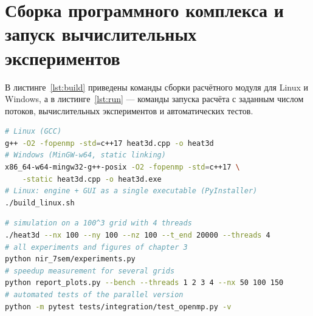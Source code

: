 \chapter{Сборка программного комплекса и запуск вычислительных экспериментов}
\label{app:build}

В листинге~\ref{lst:build} приведены команды сборки расчётного модуля для Linux и Windows, а в листинге~\ref{lst:run} --- команды запуска расчёта с заданным числом потоков, вычислительных экспериментов и автоматических тестов.

\begin{lstlisting}[language=bash, caption={Сборка расчётного модуля}, label=lst:build]
# Linux (GCC)
g++ -O2 -fopenmp -std=c++17 heat3d.cpp -o heat3d
# Windows (MinGW-w64, static linking)
x86_64-w64-mingw32-g++-posix -O2 -fopenmp -std=c++17 \
    -static heat3d.cpp -o heat3d.exe
# Linux: engine + GUI as a single executable (PyInstaller)
./build_linux.sh
\end{lstlisting}

\begin{lstlisting}[language=bash, caption={Запуск расчёта, экспериментов и тестов}, label=lst:run]
# simulation on a 100^3 grid with 4 threads
./heat3d --nx 100 --ny 100 --nz 100 --t_end 20000 --threads 4
# all experiments and figures of chapter 3
python nir_7sem/experiments.py
# speedup measurement for several grids
python report_plots.py --bench --threads 1 2 3 4 --nx 50 100 150
# automated tests of the parallel version
python -m pytest tests/integration/test_openmp.py -v
\end{lstlisting}
